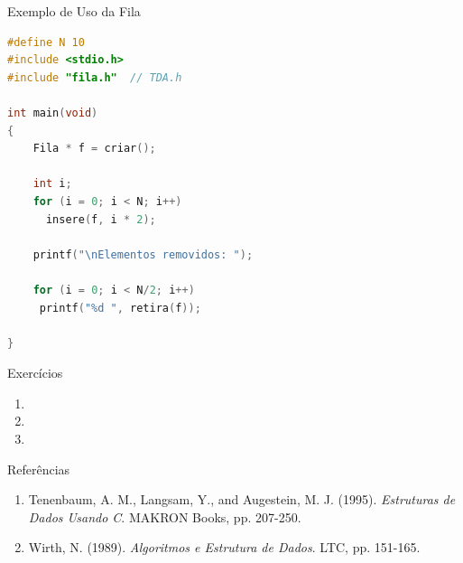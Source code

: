 \begin{frame}[fragile]{Exemplo de Uso da Fila}

\begin{footnotesize}

\begin{lstlisting}[language=C]
#define N 10
#include <stdio.h>
#include "fila.h"  // TDA.h

int main(void)
{
    Fila * f = criar();
    
    int i;
    for (i = 0; i < N; i++)
      insere(f, i * 2);
      
    printf("\nElementos removidos: ");
      
    for (i = 0; i < N/2; i++)
     printf("%d ", retira(f)); 
               
}
\end{lstlisting}
\end{footnotesize}
\end{frame} 


\begin{frame}{Exercícios}
	
	\begin{enumerate}
	\item
	\item
	\item
	
	\end{enumerate}
	
\end{frame}





\begin{frame}{Referências}
	
	\begin{enumerate}
		\item Tenenbaum, A. M., Langsam, Y., and Augestein, M. J. (1995). 
		\textit{Estruturas de Dados Usando C}. MAKRON Books, pp. 207-250.
		\item Wirth, N. (1989). \textit{Algoritmos e Estrutura de Dados}. LTC, pp. 151-165.
	
	\end{enumerate}
	
\end{frame}
